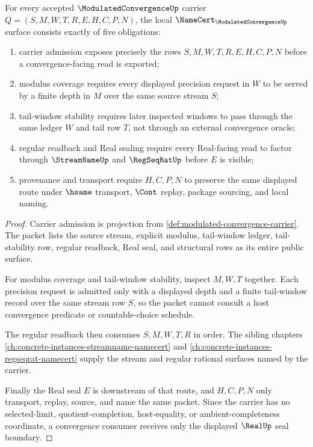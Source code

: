 \begin{theorem}
\label{thm:modulated-convergence-namecert-obligations}
For every accepted $\ModulatedConvergenceUp$ carrier $Q=(S,M,W,T,R,E,H,C,P,N)$, the local $\NameCert_{\ModulatedConvergenceUp}$ surface consists exactly of five obligations:
\begin{enumerate}
\item carrier admission exposes precisely the rows $S,M,W,T,R,E,H,C,P,N$ before a convergence-facing read is exported;
\item modulus coverage requires every displayed precision request in $W$ to be served by a finite depth in $M$ over the same source stream $S$;
\item tail-window stability requires later inspected windows to pass through the same ledger $W$ and tail row $T$, not through an external convergence oracle;
\item regular readback and Real sealing require every Real-facing read to factor through $\StreamNameUp$ and $\RegSeqRatUp$ before $E$ is visible;
\item provenance and transport require $H,C,P,N$ to preserve the same displayed route under $\hsame$ transport, $\Cont$ replay, package sourcing, and local naming.
\end{enumerate}
\end{theorem}
\begin{proof}
Carrier admission is projection from \autoref{def:modulated-convergence-carrier}. The packet lists the source stream, explicit modulus, tail-window ledger, tail-stability row, regular readback, Real seal, and structural rows as its entire public surface.

For modulus coverage and tail-window stability, inspect $M,W,T$ together. Each precision request is admitted only with a displayed depth and a finite tail-window record over the same stream row $S$, so the packet cannot consult a host convergence predicate or countable-choice schedule.

The regular readback then consumes $S,M,W,T,R$ in order. The sibling chapters \autoref{ch:concrete-instances-streamname-namecert} and \autoref{ch:concrete-instances-regseqrat-namecert} supply the stream and regular rational surfaces named by the carrier.

Finally the Real seal $E$ is downstream of that route, and $H,C,P,N$ only transport, replay, source, and name the same packet. Since the carrier has no selected-limit, quotient-completion, host-equality, or ambient-completeness coordinate, a convergence consumer receives only the displayed $\RealUp$ seal boundary.
\end{proof}

